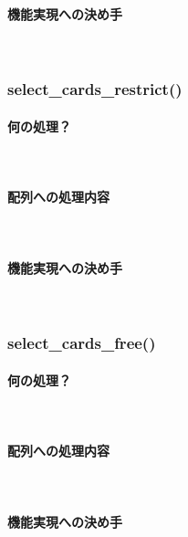 \documentclass[11pt,a4paper, uplatex]{jsarticle}
\begin{document}
\paragraph{機能実現への決め手}\mbox{}\\
%
\subsubsection{select\_cards\_restrict()}
\paragraph{何の処理？}\mbox{}\\
\paragraph{配列への処理内容}\mbox{}\\
\paragraph{機能実現への決め手}\mbox{}\\
%
\subsubsection{select\_cards\_free()}
\paragraph{何の処理？}\mbox{}\\
\paragraph{配列への処理内容}\mbox{}\\
\paragraph{機能実現への決め手}\mbox{}\\
\end{document}
